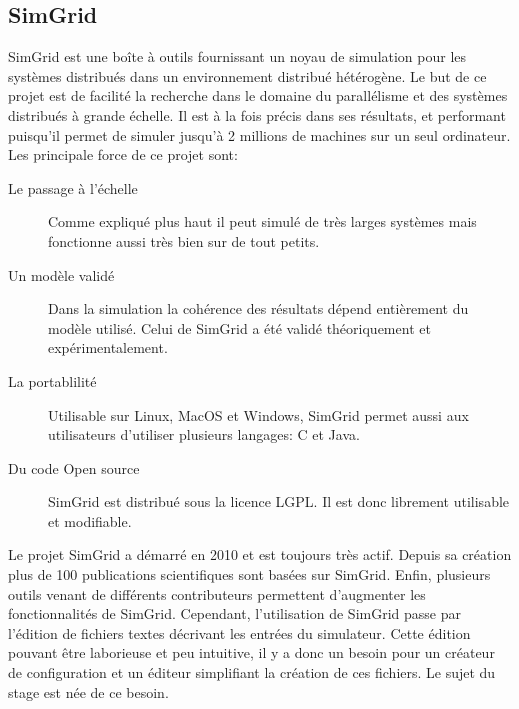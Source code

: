 \documentclass{article}
\begin{document}
	\subsection{SimGrid}
	SimGrid est une boîte à outils fournissant un noyau de simulation pour les systèmes distribués dans un environnement distribué hétérogène. Le but de ce projet est de facilité la recherche dans le domaine du parallélisme et des systèmes distribués à grande échelle. Il est à la fois précis dans ses résultats, et performant puisqu'il permet de simuler jusqu'à 2 millions de machines sur un seul ordinateur.
	Les principale force de ce projet sont:
	\begin{description}
		\item[Le passage à l'échelle] Comme expliqué plus haut il peut simulé de très larges systèmes mais fonctionne aussi très bien sur de tout petits.
		\item[Un modèle validé] Dans la simulation la cohérence des résultats dépend entièrement du modèle utilisé. Celui de SimGrid a été validé théoriquement et expérimentalement.
		\item[La portablilité] Utilisable sur Linux, MacOS et Windows, SimGrid permet aussi aux utilisateurs d'utiliser plusieurs langages: C et Java.
		\item[Du code Open source] SimGrid est distribué sous la licence LGPL. Il est donc librement utilisable et modifiable.
	\end{description}
	Le projet SimGrid a démarré en 2010 et est toujours très actif. Depuis sa création plus de 100 publications scientifiques sont basées sur SimGrid. Enfin, plusieurs outils venant de différents contributeurs permettent d'augmenter les fonctionnalités de SimGrid. 
	Cependant, l'utilisation de SimGrid passe par l'édition de fichiers textes décrivant les entrées du simulateur. Cette édition pouvant être laborieuse et peu intuitive, il y a donc un besoin pour un créateur de configuration et un éditeur simplifiant la création de ces fichiers. Le sujet du stage est née de ce besoin.
\end{document}
